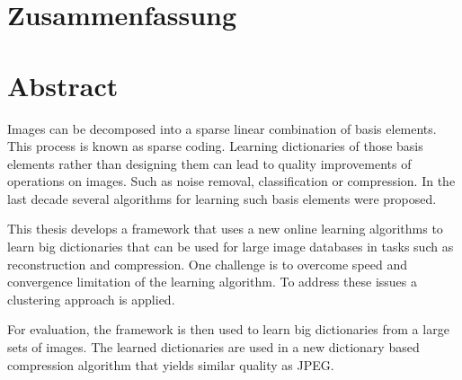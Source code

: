\newpage
{}
{}
\chapter*{Zusammenfassung}
\thispagestyle{empty}

\newpage
{}
{}
\chapter*{Abstract}
\thispagestyle{empty}

Images can be decomposed into a sparse linear combination of basis
elements. This process is known as sparse coding. Learning dictionaries of
those basis elements rather than designing them can lead to quality improvements
of operations on images. Such as noise removal, classification or compression.
In the last decade several algorithms for learning such basis elements were
proposed.

This thesis develops a framework that uses a new online learning
algorithms to learn big dictionaries that can be used for large image databases
in tasks such as reconstruction and compression. One challenge is to overcome
speed and convergence limitation of the learning algorithm. To address these
issues a clustering approach is applied. 

For evaluation, the framework is then used to learn big dictionaries from a
large sets of images. The learned dictionaries are used in a new dictionary
based compression algorithm that yields similar quality as JPEG.



